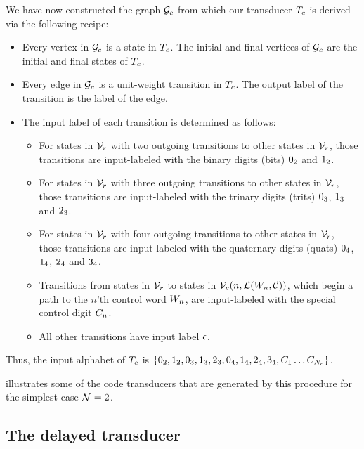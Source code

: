 \documentclass[english]{article}
\begin{document}
We have now constructed the graph ${\cal G}_c$ from which our transducer $T_c$
is derived via the following recipe:
\begin{itemize}
\item Every vertex in ${\cal G}_c$ is a state in $T_c$.
The initial and final vertices of ${\cal G}_c$ are the initial and final states of $T_c$.
\item Every edge in ${\cal G}_c$ is a unit-weight transition in $T_c$.
The output label of the transition is the label of the edge.
\item The input label of each transition is determined as follows:
\begin{itemize}
\item For states in ${\cal V}_r$ with two outgoing transitions to other states in ${\cal V}_r$, those transitions are input-labeled with the binary digits (bits) $0_2$ and $1_2$.
\item For states in ${\cal V}_r$ with three outgoing transitions to other states in ${\cal V}_r$, those transitions are input-labeled with the trinary digits (trits) $0_3$, $1_3$ and $2_3$.
\item For states in ${\cal V}_r$ with four outgoing transitions to other states in ${\cal V}_r$, those transitions are input-labeled with the quaternary digits (quats) $0_4$, $1_4$, $2_4$ and $3_4$.
\item Transitions from states in ${\cal V}_r$ to states in ${\cal V}_c(n,{\cal L}(W_n,{\cal C}))$,
which begin a path to the $n$'th control word $W_n$,
are input-labeled with the special control digit $C_{n}$.
\item All other transitions have input label $\epsilon$.
\end{itemize}
\end{itemize}

Thus, the input alphabet of $T_c$
is $\{ 0_2, 1_2,
       0_3, 1_3, 2_3,
       0_4, 1_4, 2_4, 3_4,
       C_{1} \ldots C_{N_c} \}$.

 illustrates some of the code transducers that are generated by this procedure for the simplest case ${\cal N}=2$.
       
\subsection{The delayed transducer}
\end{document}
